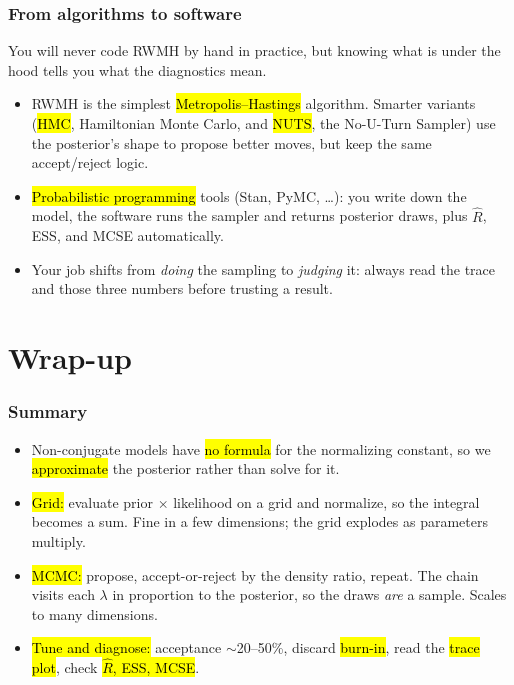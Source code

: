 \documentclass[slidestop,compress,mathserif]{beamer}
\begin{document}
\begin{frame}
\frametitle{From algorithms to software}

You will never code RWMH by hand in practice, but knowing what is under the hood tells you what the diagnostics mean.

\medskip
\begin{itemize}
    \item RWMH is the simplest \hl{Metropolis--Hastings} algorithm. Smarter variants (\hl{HMC}, Hamiltonian Monte Carlo, and \hl{NUTS}, the No-U-Turn Sampler) use the posterior's shape to propose better moves, but keep the same accept/reject logic.
    \pause
    \medskip
    \item \hl{Probabilistic programming} tools (Stan, PyMC, \ldots): you write down the model, the software runs the sampler and returns posterior draws, plus $\widehat{R}$, ESS, and MCSE automatically.
    \pause
    \medskip
    \item Your job shifts from \emph{doing} the sampling to \emph{judging} it: always read the trace and those three numbers before trusting a result.
\end{itemize}
\end{frame}

\section{Wrap-up}

\begin{frame}
\frametitle{Summary}

\begin{itemize}
\item Non-conjugate models have \hl{no formula} for the normalizing constant, so we \hl{approximate} the posterior rather than solve for it.
\pause
\item \hl{Grid:} evaluate prior $\times$ likelihood on a grid and normalize, so the integral becomes a sum. Fine in a few dimensions; the grid explodes as parameters multiply.
\pause
\item \hl{MCMC:} propose, accept-or-reject by the density ratio, repeat. The chain visits each $\lambda$ in proportion to the posterior, so the draws \emph{are} a sample. Scales to many dimensions.
\pause
\item \hl{Tune and diagnose:} acceptance $\sim$20--50\%, discard \hl{burn-in}, read the \hl{trace plot}, check \hl{$\widehat{R}$, ESS, MCSE}.
\end{itemize}

\end{frame}
\end{document}
